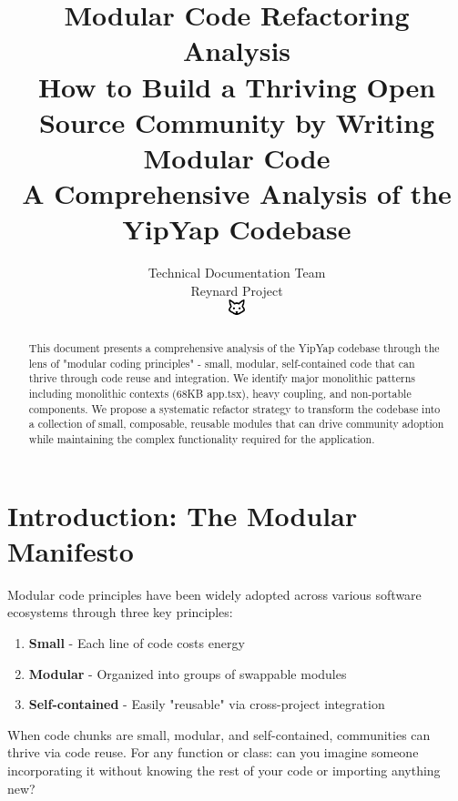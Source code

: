 \documentclass[11pt]{article}
\begin{document}
\title{\textbf{Modular Code Refactoring Analysis} \\
\Large{How to Build a Thriving Open Source Community by Writing Modular Code} \\
\large{A Comprehensive Analysis of the YipYap Codebase}}

\author{Technical Documentation Team\\
Reynard Project\\
\includegraphics[width=0.5cm]{favicon.pdf}}

\maketitle

\begin{abstract}
This document presents a comprehensive analysis of the YipYap codebase through the lens of "modular coding principles" - small, modular, self-contained code that can thrive through code reuse and integration. We identify major monolithic patterns including monolithic contexts (68KB app.tsx), heavy coupling, and non-portable components. We propose a systematic refactor strategy to transform the codebase into a collection of small, composable, reusable modules that can drive community adoption while maintaining the complex functionality required for the application.
\end{abstract}

\tableofcontents
\newpage

\section{Introduction: The Modular Manifesto}

Modular code principles have been widely adopted across various software ecosystems through three key principles:

\begin{enumerate}
\item \textbf{Small} - Each line of code costs energy
\item \textbf{Modular} - Organized into groups of swappable modules  
\item \textbf{Self-contained} - Easily "reusable" via cross-project integration
\end{enumerate}

When code chunks are small, modular, and self-contained, communities can thrive via code reuse. For any function or class: can you imagine someone incorporating it without knowing the rest of your code or importing anything new?
\end{document}
